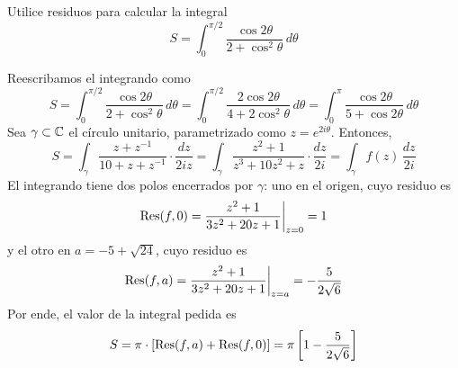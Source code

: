 \begin{exercise}
Utilice residuos para calcular la integral
$$S = \int_0^{\pi/2} \frac {\cos 2\theta} {2 + \cos^2 \theta} \, d\theta$$
\end{exercise}

\begin{solution}
Reescribamos el integrando como
$$
S
    = \int_0^{\pi/2} \frac {\cos 2\theta} {2 + \cos^2 \theta} \, d\theta
    = \int_0^{\pi/2} \frac {2 \cos 2\theta} {4 + 2 \cos^2 \theta} \, d\theta
    = \int_0^\pi \frac {\cos 2\theta} {5 + \cos 2\theta} \, d\theta
$$
Sea $\gamma \subset \mathbb C$ el círculo unitario, parametrizado como $z = e^{2i\theta}$. Entonces,
$$
S
    = \int_\gamma \frac {z + z^{-1}} {10 + z + z^{-1}} \cdot \frac {dz} {2iz}
    = \int_\gamma \frac {z^2 + 1} {z^3 + 10z^2 + z} \cdot \frac {dz} {2i}
    = \int_\gamma f(z) \, \frac {dz} {2i}
$$
El integrando tiene dos polos encerrados por $\gamma$: uno en el origen, cuyo residuo es
$$\operatorname{Res}(f, 0) = \frac {z^2 + 1} {3z^2 + 20z + 1} \bigg \vert_{z = 0} = 1$$
y el otro en $a = -5 + \sqrt {24}$, cuyo residuo es
$$\operatorname{Res}(f, a) = \frac {z^2 + 1} {3z^2 + 20z + 1} \bigg \vert_{z = a} = -\frac 5 {2 \sqrt 6}$$
Por ende, el valor de la integral pedida es
$$S = \pi \cdot [\operatorname{Res}(f, a) + \operatorname{Res}(f, 0)] = \pi \left[ 1 - \frac 5 {2 \sqrt 6} \right]$$
\end{solution}
